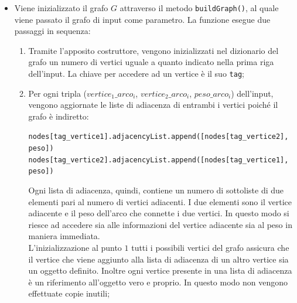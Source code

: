 	\begin{itemize}
		\item Viene inizializzato il grafo $G$ attraverso il metodo \texttt{buildGraph()}, al quale viene passato il grafo di input come parametro. 
		La funzione esegue due passaggi in sequenza:
		\begin{enumerate}
			\item Tramite l'apposito costruttore, vengono inizializzati nel dizionario del grafo un numero di vertici uguale a quanto indicato nella prima riga dell'input. La chiave per accedere ad un vertice è il suo \texttt{tag};
			\item Per ogni tripla ($vertice_1\_arco_i$, $vertice_2\_arco_i$, $peso\_arco_i$) dell'input, vengono aggiornate le liste di adiacenza di entrambi i vertici poiché il grafo è indiretto:
			
			\texttt{nodes[tag\_vertice1].adjacencyList.append([nodes[tag\_vertice2], peso])}
			\texttt{nodes[tag\_vertice2].adjacencyList.append([nodes[tag\_vertice1], peso])}
			
			Ogni lista di adiacenza, quindi, contiene un numero di sottoliste di due elementi pari al numero di vertici adiacenti. 
			I due elementi sono il vertice adiacente e il peso dell'arco che connette i due vertici. 
			In questo modo si riesce ad accedere sia alle informazioni del vertice adiacente sia al peso in maniera immediata.\\
			L'inizializzazione al punto $1$ tutti i possibili vertici del grafo assicura che il vertice che viene aggiunto alla lista di adiacenza di un altro vertice sia un oggetto definito. 
			Inoltre ogni vertice presente in una lista di adiacenza è un riferimento all'oggetto vero e proprio. 
			In questo modo non vengono effettuate copie inutili;
		\end{enumerate}
	

\end{itemize}
